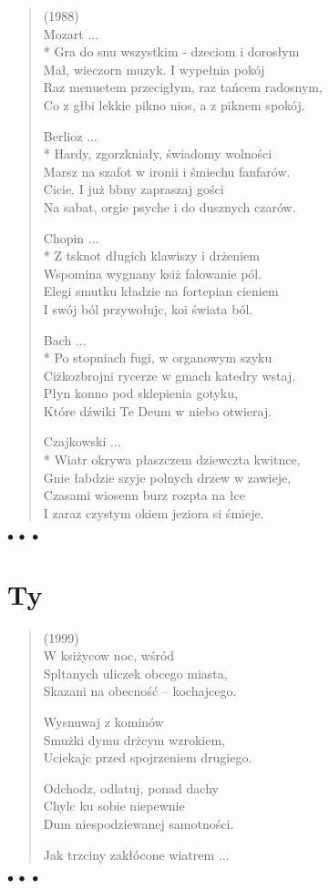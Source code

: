 \documentclass{article} %
\newenvironment{wierszd}[2]
	{\begin{verse} \hspace*{-1em}{\bf #1}\hfill{\small{(#2)}}\\[.5ex] }
	{\end{verse} \begin{center}$\bullet\ \bullet\ \bullet$\end{center}}
\newcommand{\chap}[1]{\newpage\section*{#1}}
\newcommand{\e}{\eob}
\renewcommand{\a}{\aob}
\renewcommand{\o}{\'{o}}
\newcommand{\z}{\'{z}}
\newcommand{\n}{\'{n}}
\newcommand{\s}{\'{s}}
\newcommand{\ci}{\'{c}}
\begin{document}
\begin{wierszd}{}{1988} %
	Mozart ... \\* 
Gra do snu wszystkim - dzeciom i doros{\l}ym \\ 
Ma{\l}{\a}, wieczorn{\a} muzyk{\e}. I wype{\l}nia pok{\o}j \\ 
Raz menuetem przeci{\a}g{\l}ym, raz ta{\n}cem radosnym, \\ 
Co z g{\l}{\e}bi lekkie pi{\e}kno nios{\a}, a z pi{\e}knem spok{\o}j. 
 
	Berlioz ... \\* 
Hardy, zgorzknia{\l}y, {\s}wiadomy wolno{\s}ci \\ 
Marsz na szafot w ironii i {\s}miechu fanfar{\o}w. \\ 
Ci{\e}cie. I ju\.{z} b{\e}bny zapraszaj{\a} go{\s}ci \\ 
Na sabat, orgie psyche i do dusznych czar{\o}w. 
 
	Chopin ... \\*
Z t{\e}sknot{\a} d{\l}ugich klawiszy i dr\.{z}eniem \\ 
Wspomina wygnany ksi{\a}\.{z}{\e} falowanie p{\o}l. \\ 
Elegi{\e} smutku k{\l}adzie na fortepian cieniem \\ 
I sw{\o}j b{\o}l przywo{\l}uj{\a}c, koi {\s}wiata b{\o}l. 

	Bach ... \\*
Po stopniach fugi, w organowym szyku \\ 
Ci{\e}\.{z}kozbrojni rycerze w gmach katedry wstaj{\a}. \\ 
P{\l}yn{\a} konno pod sklepienia gotyku, \\ 
Kt{\o}re d{\z}wi{\e}ki Te Deum w niebo otwieraj{\a}. 
 
	Czajkowski ... \\*
Wiatr okrywa p{\l}aszczem dziewcz{\e}ta kwitn{\a}ce, \\ 
Gnie {\l}ab{\e}dzie szyje polnych drzew w zawieje, \\ 
Czasami wiosenn{\a} burz{\e} rozp{\e}ta na {\l}{\a}ce \\ 
I zaraz czystym okiem jeziora si{\e} {\s}mieje. 
\end{wierszd}

\chap{Ty}


\begin{wierszd}{Widzia{\l}em par{\e}}{1999}
W ksi{\e}\.{z}ycow{\a} noc, w{\s}r{\o}d\\
Spl{\a}tanych uliczek obcego miasta,\\
Skazani na obecno{\s}{\ci} -- kochaj{\a}cego.

Wysnuwaj{\a} z komin{\o}w\\
Smu\.{z}ki dymu dr\.{z}{\a}cym wzrokiem,\\
Uciekaj{\a}c przed spojrzeniem drugiego.

Odchodz{\a}, odlatuj{\a}, ponad dachy\\
Chyl{\a}c ku sobie niepewnie\\
Dum{\e} niespodziewanej samotno{\s}ci.

Jak trzciny zak{\l}{\o}cone wiatrem ...

\end{wierszd}
\end{document}
